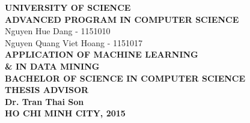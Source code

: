 \begin{titlepage}
{}

\begin{center}
{\selectfont
\textbf{\large UNIVERSITY OF SCIENCE \\[0.25cm]
ADVANCED PROGRAM IN COMPUTER SCIENCE}\\[1cm]

\textsf{\large Nguyen Hue Dang - 1151010 \\
Nguyen Quang Viet Hoang - 1151017
}\\[3cm]

\textbf{\color[rgb]{0.255, 0.412, 0.882} \Large 
APPLICATION OF MACHINE LEARNING \\[0.25cm] \& IN DATA MINING
}
}\\[2cm]
\textbf{ \large
BACHELOR OF SCIENCE IN COMPUTER SCIENCE\\[3cm]
}
\textbf{ \large
THESIS ADVISOR\\[0.25cm]
Dr. Tran Thai Son
}\\[3.5cm]
\textbf{ \normalsize
HO CHI MINH CITY, 2015
}


\end{center}


\end{titlepage}
